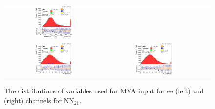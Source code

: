 \begin{figure}[ht]
\begin{center}
\begin{tabular}{ccc}
      \includegraphics[width=0.4\textwidth]{figures/tW/fig/MVA_input/mumu/H_2j1b_M_l1_j2.png}\\
      \includegraphics[width=0.4\textwidth]{figures/tW/fig/MVA_input/ee/H_2j1b_Ptll.png}&
      \includegraphics[width=0.4\textwidth]{figures/tW/fig/MVA_input/mumu/H_2j1b_Ptll.png}\\
    \end{tabular}
    \caption{The distributions of variables used for MVA input for ee (left) and \mumu (right) channels for NN$_{21}$.
    \label{fig:MVA_2j1t_2}}
  \end{center}
\end{figure}






